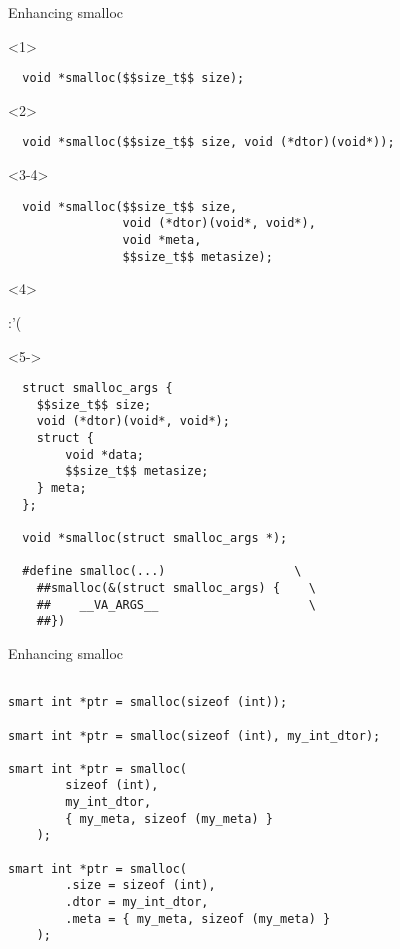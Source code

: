\documentclass[10pt]{beamer}
\begin{document}
\begin{frame}[fragile]{Enhancing smalloc}

  \begin{onlyenv}<1>
    \begin{lstlisting}
  void *smalloc($$size_t$$ size);
    \end{lstlisting}
  \end{onlyenv}

  \begin{onlyenv}<2>
    \begin{lstlisting}
  void *smalloc($$size_t$$ size, void (*dtor)(void*));
    \end{lstlisting}
  \end{onlyenv}

  \begin{onlyenv}<3-4>
    \begin{lstlisting}
  void *smalloc($$size_t$$ size,
                void (*dtor)(void*, void*),
                void *meta,
                $$size_t$$ metasize);
    \end{lstlisting}
  \end{onlyenv}

  \begin{onlyenv}<4>
    \begin{center}
      \Huge:'(\normalsize
    \end{center}
  \end{onlyenv}

  \begin{onlyenv}<5->

    \begin{lstlisting}
  struct smalloc_args {
    $$size_t$$ size;
    void (*dtor)(void*, void*);
    struct {
        void *data;
        $$size_t$$ metasize;
    } meta;
  };

  void *smalloc(struct smalloc_args *);

  #define smalloc(...)                  \
    ##smalloc(&(struct smalloc_args) {    \
    ##    __VA_ARGS__                     \
    ##})
    \end{lstlisting}

  \end{onlyenv}

\end{frame}

\begin{frame}[fragile]{Enhancing smalloc}

    \begin{lstlisting}

smart int *ptr = smalloc(sizeof (int));

smart int *ptr = smalloc(sizeof (int), my_int_dtor);

smart int *ptr = smalloc(
        sizeof (int),
        my_int_dtor,
        { my_meta, sizeof (my_meta) }
    );

smart int *ptr = smalloc(
        .size = sizeof (int),
        .dtor = my_int_dtor,
        .meta = { my_meta, sizeof (my_meta) }
    );
    \end{lstlisting}

\end{frame}
\end{document}

